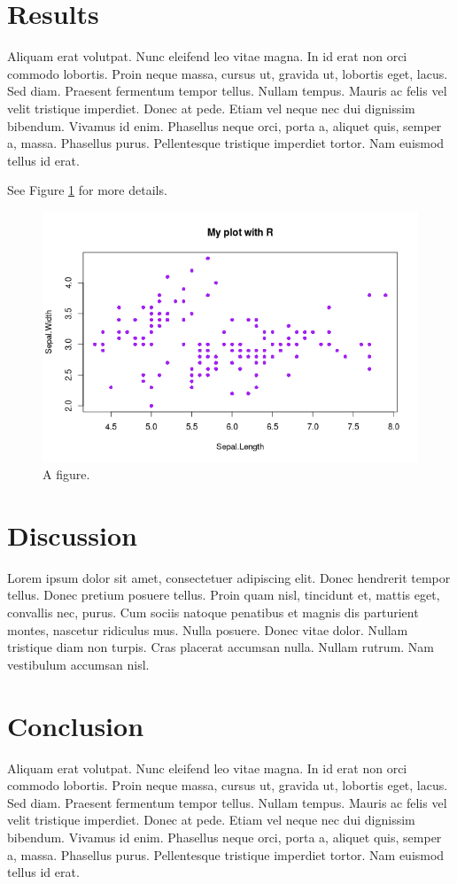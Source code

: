\documentclass[APA,LATO1COL]{WileyNJD-v2}
\begin{document}
\section{Results}
\label{sec:org6a3f23a}
Aliquam erat volutpat.  Nunc eleifend leo vitae magna.  In id erat non orci commodo lobortis.  Proin neque massa, cursus ut, gravida ut, lobortis eget, lacus.  Sed diam.  Praesent fermentum tempor tellus.  Nullam tempus.  Mauris ac felis vel velit tristique imperdiet.  Donec at pede.  Etiam vel neque nec dui dignissim bibendum.  Vivamus id enim.  Phasellus neque orci, porta a, aliquet quis, semper a, massa.  Phasellus purus.  Pellentesque tristique imperdiet tortor.  Nam euismod tellus id erat.

See Figure \ref{fig-scatterplot} for more details.

\begin{figure}[htbp]
\centering
\includegraphics[width=0.6 \textwidth]{figures/scatterplot.png}
\caption{A figure. \label{fig-scatterplot}}
\end{figure}

\section{Discussion}
\label{sec:orge5df4ae}
Lorem ipsum dolor sit amet, consectetuer adipiscing elit.  Donec hendrerit tempor tellus.  Donec pretium posuere tellus.  Proin quam nisl, tincidunt et, mattis eget, convallis nec, purus.  Cum sociis natoque penatibus et magnis dis parturient montes, nascetur ridiculus mus.  Nulla posuere.  Donec vitae dolor.  Nullam tristique diam non turpis.  Cras placerat accumsan nulla.  Nullam rutrum.  Nam vestibulum accumsan nisl.

\section{Conclusion}
\label{sec:org25ce749}
Aliquam erat volutpat.  Nunc eleifend leo vitae magna.  In id erat non orci commodo lobortis.  Proin neque massa, cursus ut, gravida ut, lobortis eget, lacus.  Sed diam.  Praesent fermentum tempor tellus.  Nullam tempus.  Mauris ac felis vel velit tristique imperdiet.  Donec at pede.  Etiam vel neque nec dui dignissim bibendum.  Vivamus id enim.  Phasellus neque orci, porta a, aliquet quis, semper a, massa.  Phasellus purus.  Pellentesque tristique imperdiet tortor.  Nam euismod tellus id erat.

%
\end{document}
